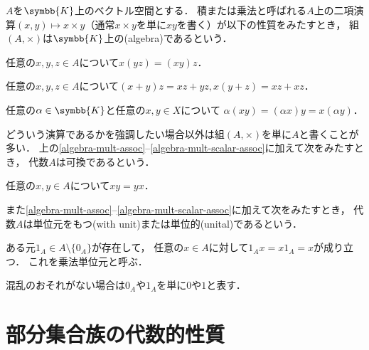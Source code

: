 \documentclass{ltjsbook}
\begin{document}
\begin{thmbox}
\begin{definition}[（代数）]
\(A\)を\(\symbb{K}\)上のベクトル空間とする．
積または乗法と呼ばれる\(A\)上の二項演算\((x, y) \mapsto x \mathbin{\times} y\)（通常\(x \mathbin{\times} y\)を単に\(xy\)を書く）が以下の性質をみたすとき，
組\((A, \mathord{\times})\)は\(\symbb{K}\)上の(algebra)であるという．
\begin{conditions}
    \item\label{algebra-mult-assoc} 任意の\(x, y, z \in A\)について\(x (yz) = (xy) z\)．
    \item 任意の\(x, y, z \in A\)について\((x + y) z = xz + yz, x (y + z) = xz + xz\)．
    \item\label{algebra-mult-scalar-assoc} 任意の\(\alpha \in \symbb{K}\)と任意の\(x, y \in X\)について
        \(\alpha (xy) = (\alpha x) y = x (\alpha y)\)．
\end{conditions}
どういう演算であるかを強調したい場合以外は組\((A, \mathord{\times})\)を単に\(A\)と書くことが多い．
上の\ref{algebra-mult-assoc}--\ref{algebra-mult-scalar-assoc}に加えて次をみたすとき，
代数\(A\)は可換であるという．
\begin{conditions}[resume]
    \item 任意の\(x, y\in A\)について\(x y  = y x\)．
\end{conditions}
また\ref{algebra-mult-assoc}--\ref{algebra-mult-scalar-assoc}に加えて次をみたすとき，
代数\(A\)は単位元をもつ(with unit)または単位的(unital)であるという．
\begin{conditions}[resume]
    \item ある元\(1_A \in A \setminus \{0_A\}\)が存在して，
        任意の\(x \in A\)に対して\(1_A x  = x 1_A = x\)が成り立つ．
        これを乗法単位元と呼ぶ．
\end{conditions}
\end{definition}
\end{thmbox}

\noindent 混乱のおそれがない場合は\(0_A\)や\(1_A\)を単に\(0\)や\(1\)と表す．

\section{部分集合族の代数的性質}
\end{document}
